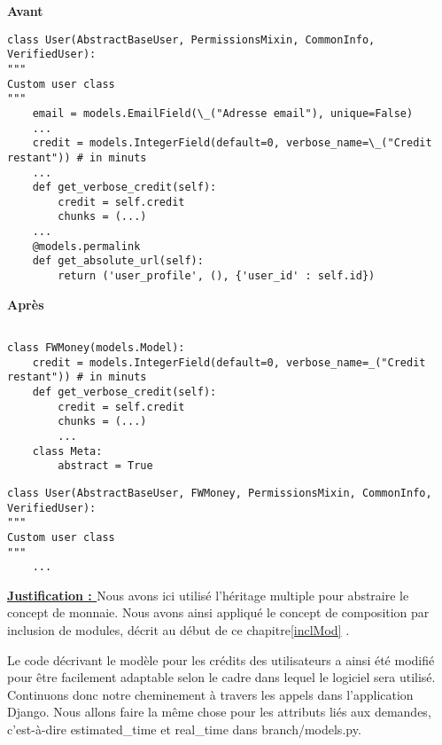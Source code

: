\begin{minipage}{.5\textwidth}
\begin{center} \textbf{Avant}\end{center}
\begin{lstlisting}
class User(AbstractBaseUser, PermissionsMixin, CommonInfo, VerifiedUser):
"""
Custom user class
"""
	email = models.EmailField(\_("Adresse email"), unique=False)
	...
	credit = models.IntegerField(default=0, verbose_name=\_("Credit restant")) # in minuts
	...
	def get_verbose_credit(self):
		credit = self.credit
		chunks = (...)
	...
	@models.permalink
	def get_absolute_url(self):
		return ('user_profile', (), {'user_id' : self.id})
\end{lstlisting} 
\end{minipage}
\hspace{0.3cm}
\begin{minipage}{.5\textwidth}
\begin{center} \textbf{Après}\end{center}
\begin{lstlisting}

class FWMoney(models.Model):
    credit = models.IntegerField(default=0, verbose_name=_("Credit restant")) # in minuts   
    def get_verbose_credit(self):
        credit = self.credit
        chunks = (...)
        ...
    class Meta:
        abstract = True
\end{lstlisting} 

\begin{lstlisting}
class User(AbstractBaseUser, FWMoney, PermissionsMixin, CommonInfo, VerifiedUser):
"""
Custom user class
"""
	...
\end{lstlisting} 
\end{minipage}

\textbf{\underline{Justification : }} Nous avons ici utilisé l'héritage multiple pour abstraire le concept de monnaie.  Nous avons ainsi appliqué le concept de composition par inclusion de modules,  décrit au début de ce chapitre\ref{inclMod} .

Le code décrivant le modèle pour les crédits des utilisateurs a ainsi été modifié pour être facilement adaptable selon le cadre dans lequel le logiciel sera utilisé.  Continuons donc notre cheminement à travers les appels dans l'application Django.  Nous allons faire la même chose pour les attributs liés aux demandes,  c'est-à-dire estimated\_time et real\_time dans branch/models.py.  


